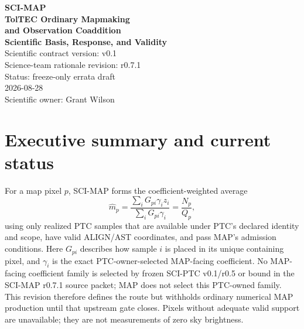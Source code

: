 \documentclass[10pt]{article}
\begin{document}
\begin{titlepage}
\centering\vspace*{0.48in}
{\Large\color{MapBlue}\textbf{SCI-MAP}}\\[0.18in]
{\huge\color{MapNavy}\textbf{TolTEC Ordinary Mapmaking}}\\[0.08in]
{\LARGE\color{MapNavy}\textbf{and Observation Coaddition}}\\[0.10in]
{\Large\color{MapBlue}\textbf{Scientific Basis, Response, and Validity}}\\[0.38in]
{\large Scientific contract version: v0.1}\\[0.06in]
{\large Science-team rationale revision: r0.7.1}\\[0.06in]
{\large Status: freeze-only errata draft}\\[0.08in]
{\large 2026-08-28}\\[0.42in]
\vfill {\large Scientific owner: Grant Wilson}
\end{titlepage}

\section*{Executive summary and current status}
For a map pixel \(p\), SCI-MAP forms the coefficient-weighted average
\begin{equation}
 \widehat m_p=\frac{\sum_iG_{pi}\gamma_i z_i}
                         {\sum_iG_{pi}\gamma_i}
 =\frac{N_p}{Q_p},
 \label{eq:map}
\end{equation}
using only realized PTC samples that are available under PTC's declared
identity and scope, have valid ALIGN/AST coordinates, and pass MAP's admission
conditions. Here \(G_{pi}\) describes how
sample \(i\) is placed in its unique containing pixel, and \(\gamma_i\) is the
exact PTC-owner-selected MAP-facing coefficient. No MAP-facing coefficient
family is selected by frozen SCI-PTC v0.1/r0.5 or bound in the SCI-MAP r0.7.1
source packet; MAP does not select this PTC-owned family. This revision
therefore defines the route but withholds ordinary numerical MAP production
until that upstream gate closes. Pixels without adequate valid support
are unavailable; they are not measurements of zero sky brightness.
\end{document}
